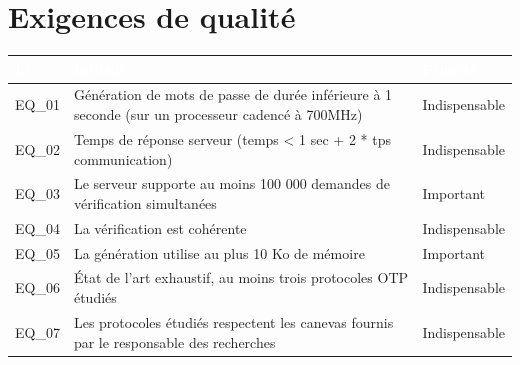 \documentclass{"../../res/univ-projet"}
\begin{document}
\section{Exigences de qualité}
\begin{tabular}{|p{}|p{}|p{}|}
    \hline
    \rowcolor{gray}
    \textcolor{white}{Id} & \textcolor{white}{Intitulé} & \textcolor{white}{Priorité}\\
    \hline
    EQ\_01 & Génération de mots de passe de durée inférieure à 1 seconde (sur un processeur cadencé à 700MHz) & Indispensable\\
    \hline
    EQ\_02 & Temps de réponse serveur (temps < 1 sec + 2 * tps communication) & Indispensable\\
    \hline
    EQ\_03 & Le serveur supporte au moins 100 000 demandes de vérification simultanées & Important\\
    \hline
    EQ\_04 & La vérification est cohérente & Indispensable\\
    \hline
    EQ\_05 & La génération utilise au plus 10 Ko de mémoire & Important\\
    \hline
    EQ\_06 & État de l'art exhaustif, au moins trois protocoles OTP étudiés & Indispensable\\
    \hline
    EQ\_07 & Les protocoles étudiés respectent les canevas fournis par le responsable des recherches & Indispensable\\
    \hline
\end{tabular}
\end{document}
